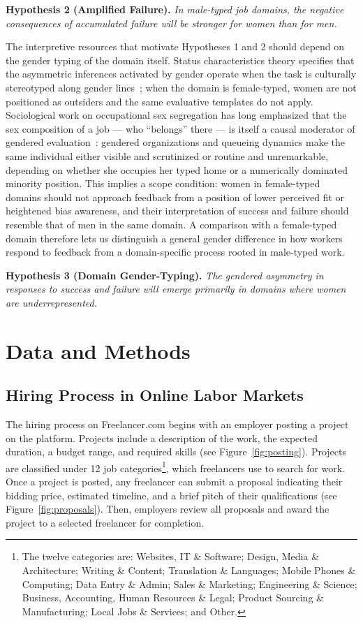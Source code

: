 \documentclass[12pt]{article}
\begin{document}
\medskip
\noindent\textbf{Hypothesis 2 (Amplified Failure).} \textit{In male-typed job domains, the negative consequences of accumulated failure will be stronger for women than for men.}
\medskip


The interpretive resources that motivate Hypotheses 1 and 2 should depend on the gender typing of the domain itself. Status characteristics theory specifies that the asymmetric inferences activated by gender operate when the task is culturally stereotyped along gender lines~\citep{ridgeway2011framed, schmader2008integrated}; when the domain is female-typed, women are not positioned as outsiders and the same evaluative templates do not apply. Sociological work on occupational sex segregation has long emphasized that the sex composition of a job --- who ``belongs'' there --- is itself a causal moderator of gendered evaluation~\citep{reskin1990job, acker1990hierarchies}: gendered organizations and queueing dynamics make the same individual either visible and scrutinized or routine and unremarkable, depending on whether she occupies her typed home or a numerically dominated minority position. This implies a scope condition: women in female-typed domains should not approach feedback from a position of lower perceived fit or heightened bias awareness, and their interpretation of success and failure should resemble that of men in the same domain. A comparison with a female-typed domain therefore lets us distinguish a general gender difference in how workers respond to feedback from a domain-specific process rooted in male-typed work.

\medskip
\noindent\textbf{Hypothesis 3 (Domain Gender-Typing).} \textit{The gendered asymmetry in responses to success and failure will emerge primarily in domains where women are underrepresented.}
\medskip




\section{Data and Methods}

\subsection{Hiring Process in Online Labor Markets}
The hiring process on Freelancer.com begins with an employer posting a project on the platform. Projects include a description of the work, the expected duration, a budget range, and required skills (see Figure~\ref{fig:posting}). 
Projects are classified under 12 job categories\footnote{The twelve categories are: Websites, IT \& Software; Design, Media \& Architecture; Writing \& Content; Translation \& Languages; Mobile Phones \& Computing; Data Entry \& Admin; Sales \& Marketing; Engineering \& Science; Business, Accounting, Human Resources \& Legal; Product Sourcing \& Manufacturing; Local Jobs \& Services; and Other.}, which freelancers use to search for work. Once a project is posted, any freelancer can submit a proposal indicating their bidding price, estimated timeline, and a brief pitch of their qualifications (see Figure~\ref{fig:proposals}). Then, employers review all proposals and award the project to a selected freelancer for completion.
\end{document}

